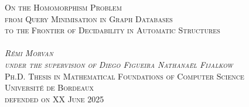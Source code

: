 \begin{titlepage}
\begin{center}
  \Huge\scshape{%
  On the Homomorphism Problem}\\[.2cm]
  \LARGE\scshape{%
  from Query Minimisation in Graph Databases\\[.2cm]to the Frontier of Decidability in Automatic Structures}\\
  \vspace{5cm}
  \\
  \vfill
  \normalfont%
  \huge{}\emph{Rémi Morvan}\\
  \large\emph{under the supervision of 
  Diego Figueira {\color{maincolor}\fancyand} Nathanaël Fijalkow}\\[1cm]
  \normalfont\Large\scshape
  Ph.D. Thesis in Mathematical Foundations of Computer Science\\
  \textcolor{maincolor}{Université de Bordeaux}\\
  defended on XX June 2025
\end{center}
\end{titlepage}
\restoregeometry